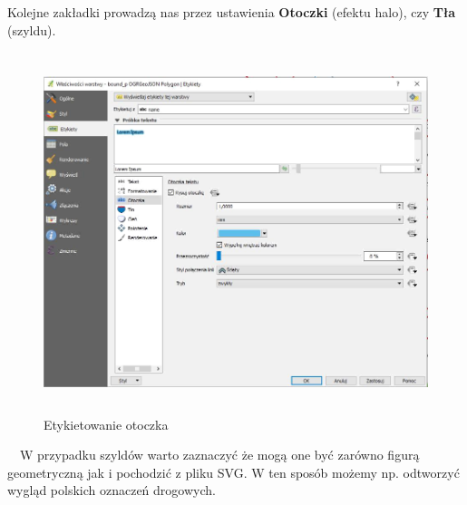 \documentclass[12pt,a4paper]{book}
\begin{document}
Kolejne zakładki prowadzą nas przez ustawienia \textbf{Otoczki }(efektu halo), czy \textbf{Tła }(szyldu).

\begin{center}
\begin{figure}
\includegraphics[width=13cm,height=10.499cm]{007-etykiety-otoczka.png}
\caption{Etykietowanie otoczka}
\end{figure}
\end{center}
\ \ W przypadku szyldów warto zaznaczyć że mogą one być zarówno figurą geometryczną jak i pochodzić z pliku SVG. W ten sposób możemy np. odtworzyć wygląd polskich oznaczeń drogowych.
\end{document}
